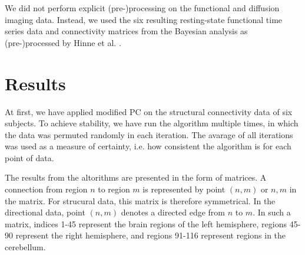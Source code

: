 \documentclass[a4paper, 10pt, english, onecolumn]{article}
\begin{document}
We did not perform explicit (pre-)processing on the functional and diffusion imaging data.
Instead, we used the six resulting resting-state functional time series data and connectivity matrices from the Bayesian analysis as (pre-)processed by Hinne et al. \cite{hinne2013}.

\section{Results}
At first, we have applied modified PC on the structural connectivity data of six subjects.
To achieve stability, we have run the algorithm multiple times, in which the data was permuted randomly in each iteration.
The avarage of all iterations was used as a measure of certainty, i.e. how consistent the algorithm is for each point of data.

The results from the altorithms are presented in the form of matrices.
A connection from region $n$ to region $m$ is represented by point $(n,m)$ or $n,m$ in the matrix.
For strucural data, this matrix is therefore symmetrical.
In the directional data, point $(n,m)$ denotes a directed edge from $n$ to $m$.
In such a matrix, indices 1-45 represent the brain regions of the left hemisphere, regions 45-90 represent the right hemisphere, and regions 91-116 represent regions in the cerebellum. %
\end{document}
